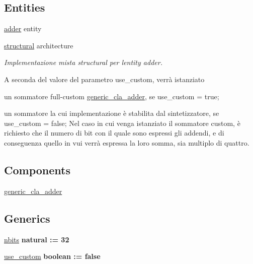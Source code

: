 \subsection*{Entities}
\begin{DoxyCompactItemize}
\item 
\hyperlink{classadder}{adder} entity
\item 
\hyperlink{classadder_1_1structural}{structural} architecture
\begin{DoxyCompactList}\small\item\em Implementazione mista structural per l\textquotesingle{}entity adder.

A seconda del valore del parametro use\+\_\+custom, verrà istanziato
\begin{DoxyItemize}
\item un sommatore full-\/custom \hyperlink{classgeneric__cla__adder}{generic\+\_\+cla\+\_\+adder}, se use\+\_\+custom = true;
\item un sommatore la cui implementazione è stabilita dal sintetizzatore, se use\+\_\+custom = false; Nel caso in cui venga istanziato il sommatore custom, è richiesto che il numero di bit con il quale sono espressi gli addendi, e di conseguenza quello in vui verrà espressa la loro somma, sia multiplo di quattro. 
\end{DoxyItemize}\end{DoxyCompactList}\end{DoxyCompactItemize}
\subsection*{Components}
 \begin{DoxyCompactItemize}
\item 
\hyperlink{group___adder_gae7148956d4ef1d1cd14f35060634b9c3}{generic\+\_\+cla\+\_\+adder}  {\bfseries }  
\end{DoxyCompactItemize}
\subsection*{Generics}
 \begin{DoxyCompactItemize}
\item 
\hyperlink{group___adder_gae1435c07d0cd54b521535e2f8de6f94e}{nbits} {\bfseries {\bfseries \textcolor{vhdlchar}{natural}\textcolor{vhdlchar}{ }\textcolor{vhdlchar}{ }\textcolor{vhdlchar}{\+:}\textcolor{vhdlchar}{=}\textcolor{vhdlchar}{ }\textcolor{vhdlchar}{ } \textcolor{vhdldigit}{32} \textcolor{vhdlchar}{ }}}
\item 
\hyperlink{group___adder_gadf05ca347ec6d3c85740dc697469b3db}{use\+\_\+custom} {\bfseries {\bfseries \textcolor{vhdlchar}{boolean}\textcolor{vhdlchar}{ }\textcolor{vhdlchar}{ }\textcolor{vhdlchar}{\+:}\textcolor{vhdlchar}{=}\textcolor{vhdlchar}{ }\textcolor{vhdlchar}{ }\textcolor{vhdlchar}{ }\textcolor{vhdlchar}{ }\textcolor{vhdlchar}{false}\textcolor{vhdlchar}{ }}}
\end{DoxyCompactItemize}
